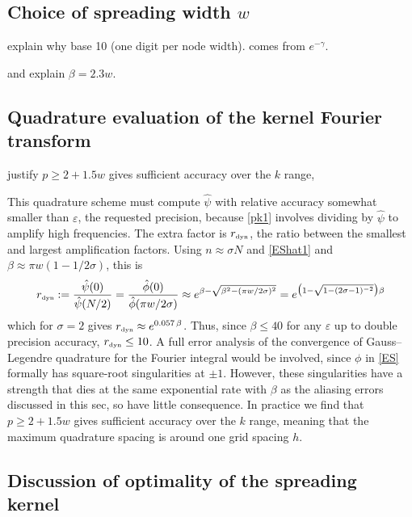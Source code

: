\documentclass[10pt]{article}
\newcommand{\be}{\begin{equation}}
\newcommand{\ee}{\end{equation}}
\newcommand{\tbox}[1]{{\mbox{\tiny #1}}}
\newcommand{\eps}{\varepsilon}
\newcommand{\freq}{\beta}          %
\newcommand{\rat}{\sigma}          %
\newcommand{\rmax}{r_\tbox{dyn}}    %
\begin{document}
\subsection{Choice of spreading width $w$}
\label{s:w}

explain why base 10 (one digit per node width).
comes from $e^{-\gamma}$.

and explain $\beta = 2.3 w$.


\subsection{Quadrature evaluation of the kernel Fourier transform}
\label{s:p}

justify  $p\ge 2+1.5 w$ gives sufficient accuracy
over the $k$ range,

This quadrature scheme must compute $\hat\psi$
with relative accuracy
somewhat smaller than $\eps$, the requested precision,
because \eqref{pk1} involves dividing by $\hat\psi$ to amplify
high frequencies.
The extra factor is $\rmax$, the ratio between the smallest and largest
amplification factors. Using $n\approx \rat N$ and
\eqref{EShat1} and $\beta \approx \pi w( 1- 1/2\rat)$,
this is
\be
\rmax := \frac{\hat\psi(0)}{\hat\psi(N/2)}
= \frac{\hat\phi(0)}{\hat\phi(\pi w/2\rat)}
\approx e^{\freq - \sqrt{\freq^2 - (\pi w/2\rat)^2}}
= e^{\bigl(1 - \sqrt{1-(2\rat-1)^{-2}}\bigr)\freq}
\label{rmax}
\ee
which for $\rat=2$ gives $\rmax \approx e^{0.057\,\freq}$.
Thus, since $\beta\le40$ for any $\eps$
up to double precision accuracy, $\rmax\le 10$.
A full error analysis of the convergence of Gauss--Legendre quadrature
for the Fourier integral would be involved, since $\phi$ in \eqref{ES}
formally has square-root singularities at $\pm 1$.
However, these singularities have a strength that dies at the same
exponential rate with $\freq$
as the aliasing errors discussed in this sec, so have
little consequence.
In practice we find that $p\ge 2+1.5 w$ gives sufficient accuracy
over the $k$ range,
meaning that the maximum quadrature spacing is around one
grid spacing $h$.






\subsection{Discussion of optimality of the spreading kernel}
\label{s:optim}
\end{document}
